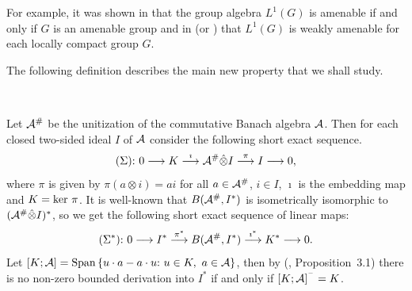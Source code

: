 \documentclass[fleqn]{mat01}
\begin{document}
For example, it was shown in \cite{Jo1} that the group algebra $L^1(G)$
is amenable if and only if $G$ is an amenable group and in \cite{Jo2}
(or \cite{D-Gh}) that $L^1(G)$ is weakly amenable for each locally
compact group $G$.

The following definition describes the main new property that we shall
study.

\begin{defini}$\left.\right.$\vspace{.5pc}

\end{defini}

Let ${\cal A}^{\#}$ be the unitization of the commutative Banach algebra
${\cal A}$. Then for each closed two-sided ideal $I$ of ${\cal A}$
consider the following short exact sequence.
\begin{equation*}
(\Sigma)\hbox{:}\ 0\longrightarrow K\stackrel{\imath}{\longrightarrow}  {\cal
A}^{\#}\hat\otimes I \stackrel{\pi}{\longrightarrow} I\longrightarrow 0,
\end{equation*}
where $\pi$ is given by $\pi(a\otimes i)=ai$ for all $a\in{\cal
A}^{\#}$, $i\in I$, $\imath$ is the embedding map and $K= {\rm ker}\ 
\pi$. It is well-known that $B({\cal A}^{\#},I^*)$ is isometrically
isomorphic to $({\cal A}^{\#}\hat\otimes I )^*$, so we get the following
short exact sequence of linear maps:
\begin{equation*}
(\Sigma^*)\hbox{:}\ 0\longrightarrow I^*\stackrel{\pi^*}{\longrightarrow}
B({\cal A}^{\#},I^*) \stackrel{\imath^*}{\longrightarrow}
K^*\longrightarrow 0.
\end{equation*}
Let $[K;{\cal A}]={\rm Span}\,\{u\cdot a-a\cdot u\hbox{:}\ u\in K,~a\in
{\cal A}\}$, then by (\cite{Gr1}, Proposition~3.1) there is no non-zero
bounded derivation into $I^*$ if and only if $[K;{\cal A}]^{^-}=K$.
\end{document}
